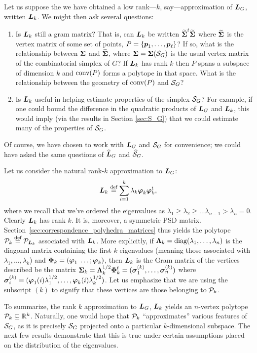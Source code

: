 Let us suppose the we have obtained a low rank---$k$, say---approximation of $\L_G$, written $\L_k$. We might then ask several questions: 
\begin{enumerate}
	\item Is $\L_k$ still a gram matrix? That is, can $\L_k$ be written $\tSv^\tp\tSv$ where $\tSv$ is the vertex matrix of some set of points, $P=\{\p_1,\dots,\p_\ell\}$? If so, what is the relationship between $\Sv$ and $\tSv$, where $\Sv=\Sv(\splx_G)$ is the usual vertex matrix of the combinatorial simplex of $G$? If $\L_k$ has rank $k$ then $P$ spans a subspace of dimension $k$ and $\conv(P)$ forms a polytope in that space. What is the relationship between the geometry of $\conv(P)$ and $\splx_G$?
	\item Is $\L_k$ useful in helping estimate properties of the simplex $\splx_G$? For example, if one could bound the difference in the quadratic products of $\L_G$ and $\L_k$, this would imply (via the results in Section \ref{sec:S_G}) that we could estimate many of the properties of $\splx_G$. 
\end{enumerate}

Of course, we have chosen to work with $\L_G$ and $\splx_G$ for convenience; we could have asked the same questions of $\Ln_G$ and $\splxn_G$. 

Let us  consider the natural rank-$k$ approximation to $\L_G$: 
\begin{equation*}
\L_k\equiv \sum_{i=1}^k \lambda_k\vp_k\vp_k^\tp,
\end{equation*}
where we recall that  we've ordered  the eigenvalues  as $\lambda_1\geq \lambda_2\geq \dots\lambda_{n-1}>\lambda_n=0$. 
Clearly $\L_k$ has rank $k$.  It is, moreover, a symmetric PSD matrix.  Section~\ref{sec:correspondence_polyhedra_matrices} thus yields the polytope $\P_k\equiv \P_{\L_k}$ associated  with $\L_k$. More  explicitly, if 
$\Eval_k=\diag(\lambda_1,\dots,\lambda_n)$ is the diagonal  matrix containing the first $k$  eigenvalues (meaning those  associated  with  $\lambda_1,\dots,\lambda_k$) and $\Eig_k = (\vp_1\;\dots;\vp_k)$, then $\L_k$ is the Gram matrix of the vertices described be the matrix $\Sv_k = \Eval_k^{1/2}\Eig_k^\tp=(\sv_1^\k,\dots,\sv_n^\k)$ where $\sv_i^\k=(\vp_1(i)\lambda_1^{1/2},\dots,\vp_k(i)\lambda_k^{1/2})$. Let us emphasize that we  are using  the subscript $(k)$ to signify that these vertices are  those belonging to  $\P_k$. 

To  summarize, the rank $k$ approximation to $\L_G$, $\L_k$  yields an  $n$-vertex polytope  $\P_k\subset\R^k$. Naturally, one would hope that $\P_k$    ``approximates'' various features of $\splx_G$, as it is precisely $\splx_G$ projected  onto a particular $k$-dimensional subspace. The next few results  demonstrate that this is true under certain  assumptions placed on the distribution of the eigenvalues. 

